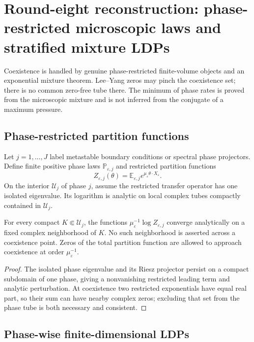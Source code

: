 \section{Round-eight reconstruction: phase-restricted microscopic laws and stratified mixture LDPs}
\label{sec:r8-d1}

Coexistence is handled by genuine phase-restricted finite-volume objects and an
exponential mixture theorem.  Lee--Yang zeros may pinch the coexistence set;
there is no common zero-free tube there.  The minimum of phase rates is proved
from the microscopic mixture and is not inferred from the conjugate of a
maximum pressure.

\subsection{Phase-restricted partition functions}

Let $j=1,\ldots,J$ label metastable boundary conditions or spectral phase
projectors.  Define finite positive phase laws $\mathbb P_{\varepsilon,j}$ and
restricted partition functions
\[
 Z_{\varepsilon,j}(\theta)
 =\mathbb E_{\varepsilon,j}e^{\mu_\varepsilon\theta\cdot X_\varepsilon}.
\]
On the interior $\mathcal U_j$ of phase $j$, assume the restricted transfer
operator has one isolated eigenvalue.  Its logarithm is analytic on local
complex tubes compactly contained in $\mathcal U_j$.

\begin{lemma}
\label{lem:r8-d1-atlas}
For every compact $K\Subset\mathcal U_j$, the functions
$\mu_\varepsilon^{-1}\log Z_{\varepsilon,j}$ converge analytically on a fixed
complex neighborhood of $K$.  No such neighborhood is asserted across a
coexistence point.  Zeros of the total partition function are allowed to
approach coexistence at order $\mu_\varepsilon^{-1}$.
\end{lemma}

\begin{proof}
The isolated phase eigenvalue and its Riesz projector persist on a compact
subdomain of one phase, giving a nonvanishing restricted leading term and
analytic perturbation.  At coexistence two restricted exponentials have equal
real part, so their sum can have nearby complex zeros; excluding that set from
the phase tube is both necessary and consistent.
\end{proof}

\subsection{Phase-wise finite-dimensional LDPs}

